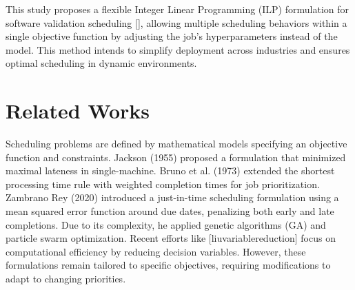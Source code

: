 \documentclass[12pt]{article}
\begin{document}



This study proposes a flexible Integer Linear Programming (ILP) formulation for software validation scheduling [], allowing multiple scheduling behaviors within a single objective function by adjusting the job's hyperparameters instead of the model. This method intends to simplify deployment across industries and ensures optimal scheduling in dynamic environments. %

\section*{Related Works}

Scheduling problems are defined by mathematical models specifying an objective function and constraints. Jackson (1955) proposed a formulation that minimized maximal lateness in single-machine. Bruno et al. (1973) extended the shortest processing time rule with weighted completion times for job prioritization. Zambrano Rey (2020) introduced a just-in-time scheduling formulation using a mean squared error function around due dates, penalizing both early and late completions. Due to its complexity, he applied genetic algorithms (GA) and particle swarm optimization. Recent efforts like [liuvariablereduction] focus on computational efficiency by reducing decision variables. However, these formulations remain tailored to specific objectives, requiring modifications to adapt to changing priorities.
\end{document}
